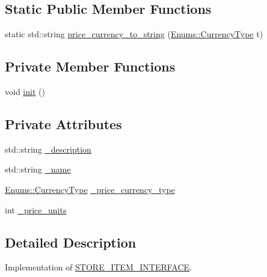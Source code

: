 \subsection*{Static Public Member Functions}
\begin{DoxyCompactItemize}
\item 
static std\+::string \hyperlink{classAsteroids_1_1Domain_1_1Store_1_1STORE__ITEM_a1d0710f3057bb6f2b3b62414d32ab3b2}{price\+\_\+currency\+\_\+to\+\_\+string} (\hyperlink{namespaceAsteroids_1_1Domain_1_1Store_1_1Enums_a995d66dbd6bc566c0765fdcfd7be6006}{Enums\+::\+Currency\+Type} t)
\end{DoxyCompactItemize}
\subsection*{Private Member Functions}
\begin{DoxyCompactItemize}
\item 
void \hyperlink{classAsteroids_1_1Domain_1_1Store_1_1STORE__ITEM_a9357d523cd548598d07e9fb36fde6b90}{init} ()
\end{DoxyCompactItemize}
\subsection*{Private Attributes}
\begin{DoxyCompactItemize}
\item 
std\+::string \hyperlink{classAsteroids_1_1Domain_1_1Store_1_1STORE__ITEM_a682f9bba95ad724e4df7bfb8b3f96c32}{\+\_\+description}
\item 
std\+::string \hyperlink{classAsteroids_1_1Domain_1_1Store_1_1STORE__ITEM_a45c6264bb127e2553b051d89f77d727d}{\+\_\+name}
\item 
\hyperlink{namespaceAsteroids_1_1Domain_1_1Store_1_1Enums_a995d66dbd6bc566c0765fdcfd7be6006}{Enums\+::\+Currency\+Type} \hyperlink{classAsteroids_1_1Domain_1_1Store_1_1STORE__ITEM_a0f6c0e364ba54a9ea1f74e3b3840a884}{\+\_\+price\+\_\+currency\+\_\+type}
\item 
int \hyperlink{classAsteroids_1_1Domain_1_1Store_1_1STORE__ITEM_a1aada5eb4bb707f6a0a83a8985fb710f}{\+\_\+price\+\_\+units}
\end{DoxyCompactItemize}


\subsection{Detailed Description}
Implementation of \hyperlink{classAsteroids_1_1Domain_1_1Store_1_1STORE__ITEM__INTERFACE}{S\+T\+O\+R\+E\+\_\+\+I\+T\+E\+M\+\_\+\+I\+N\+T\+E\+R\+F\+A\+CE}. 

